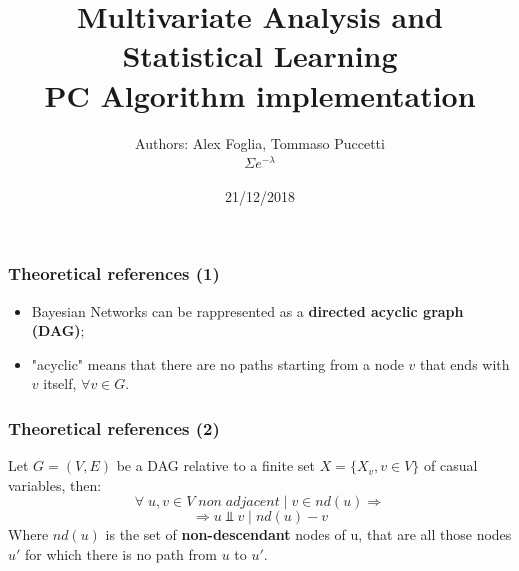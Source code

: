 \documentclass[xcolor ={table,usenames,dvipsnames}]{beamer}
\title{Multivariate Analysis and Statistical Learning \\PC Algorithm implementation}
\author{Authors: Alex Foglia, Tommaso Puccetti\\$\Sigma e^{-\lambda}$}
\institute{Universit\`a  degli Studi di Firenze}
\date{21/12/2018}
\theoremstyle{definition}
\begin{document}
	
	\begin{frame}
		\maketitle
	\end{frame}

	\begin{frame}
		\frametitle{Theoretical references (1)}
		\begin{itemize}
			\item Bayesian Networks can be rappresented as a \textbf{directed acyclic graph (DAG)};
			\item "acyclic" means that there are no paths starting from a node $v$ that ends with $v$ itself, $\forall v \in G$.
			
		\end{itemize}
	\end{frame}

	\begin{frame}
		\frametitle{Theoretical references (2)}
		Let $G = (V,E)$ be a DAG relative to a finite set  $X = \{X_{v}, v \in V\}$ of casual variables, then:
		$$
		\forall\; u,v \in V \;non\;adjacent\;|\; v \in nd(u) \Rightarrow 
		$$
		$$\Rightarrow u \Perp v \;|\; nd(u) - v $$
	Where $nd(u)$ is the set of \textbf{non-descendant} nodes of u, that are all those nodes $u'$ for which there is no path from $u$ to $u'$. \\
	\end{frame}
\end{document}
